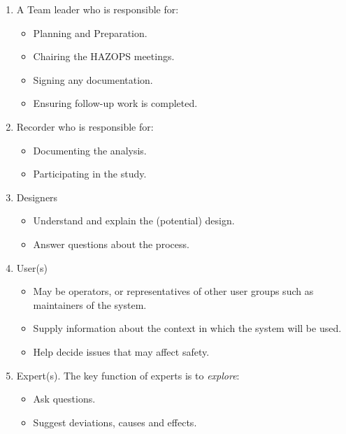   \begin{enumerate}

    \item A Team leader who is responsible for:
      \begin{itemize}
      \item Planning and Preparation.

      \item Chairing the HAZOPS meetings.

      \item Signing any documentation.

      \item Ensuring follow-up work is completed.

      \end{itemize}
    \item Recorder who is responsible for:
      \begin{itemize}
      \item Documenting the analysis.

      \item Participating in the study.

      \end{itemize}

\item Designers 
    \begin{itemize}

   \item Understand and explain the (potential) design.
 
    \item  Answer questions about the process.

    \end{itemize}

\item User(s) 

\begin{itemize}
    \item May be operators, or representatives of other user
    groups such as maintainers of the system.

    \item Supply information about the context in which the system
    will be used.

    \item  Help decide issues that may affect safety.
\end{itemize}

 \item Expert(s). The key function of experts is to {\em explore}:

  \begin{itemize}

   \item Ask questions.

   \item Suggest deviations, causes and effects.

  \end{itemize}

\end{enumerate}
  
